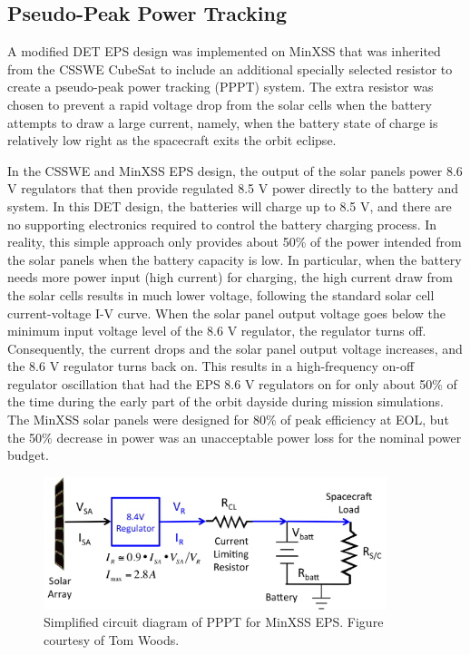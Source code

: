 \subsection{Pseudo-Peak Power Tracking}
\label{sec:pppt}
A modified DET EPS design was implemented on MinXSS that was inherited from the CSSWE CubeSat to include an additional specially selected resistor to create a pseudo-peak power tracking (PPPT) system. The extra resistor was chosen to prevent a rapid voltage drop from the solar cells when the battery attempts to draw a large current, namely, when the battery state of charge is relatively low right as the spacecraft exits the orbit eclipse.

In the CSSWE and MinXSS EPS design, the output of the solar panels power 8.6 V regulators that then provide regulated 8.5 V power directly to the battery and system. In this DET design, the batteries will charge up to 8.5 V, and there are no supporting electronics required to control the battery charging process. In reality, this simple approach only provides about 50\% of the power intended from the solar panels when the battery capacity is low. In particular, when the battery needs more power input (high current) for charging, the high current draw from the solar cells results in much lower voltage, following the standard solar cell current-voltage I-V curve. When the solar panel output voltage goes below the minimum input voltage level of the 8.6 V regulator, the regulator turns off. Consequently, the current drops and the solar panel output voltage increases, and the 8.6 V regulator turns back on. This results in a high-frequency on-off regulator oscillation that had the EPS 8.6 V regulators on for only about 50\% of the time during the early part of the orbit dayside during mission simulations. The MinXSS solar panels were designed for 80\% of peak efficiency at EOL, but the 50\% decrease in power was an unacceptable power loss for the nominal power budget.

\begin{figure}[!h]
    \begin{center}
	    \includegraphics[width=100mm]{Images/PpptDiagram.png}
    \end{center}
    \caption[Pseudo-Peak power tracker circuit]{
        Simplified circuit diagram of PPPT for MinXSS EPS. Figure courtesy of Tom Woods. 
    }
    \label{fig:ppptdiagram}
\end{figure}

